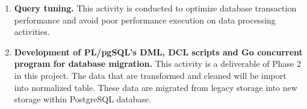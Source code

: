 \begin{enumerate}[topsep=0pt,itemsep=-1ex,partopsep=1ex,parsep=1.5ex]
	\item \textbf{Query tuning.}
	This activity is conducted to optimize database transaction performance and avoid poor performance execution on data processing activities. 
	
	\item \textbf{Development of PL/pgSQL's DML, DCL scripts and Go concurrent program for database migration.}
	This activity is a deliverable of Phase 2 in this project. The data that are transformed and cleaned will be import into normalized table. These data are migrated from legacy storage into new storage within PostgreSQL database. 
	
\end{enumerate}

